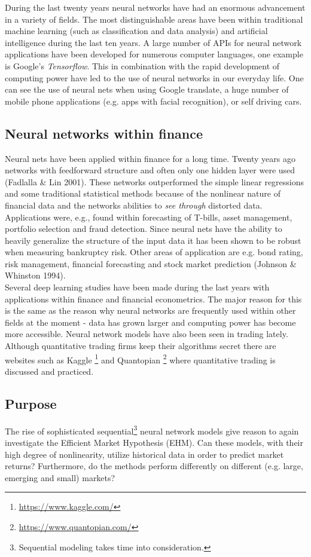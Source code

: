 \documentclass[12pt, letterpaper]{amsart}%
\begin{document}
During the last twenty years neural networks have had an enormous advancement in a variety of fields. The most distinguishable areas have been within traditional machine learning (such as classification and data analysis) and artificial intelligence during the last ten years. A large number of APIs for neural network applications have been developed for numerous computer languages, one example is Google's \textit{Tensorflow}. This in combination with the rapid development of computing power have led to the use of neural networks in our everyday life. One can see the use of neural nets when using Google translate, a huge number of mobile phone applications (e.g. apps with facial recognition), or self driving cars.

\subsection{Neural networks within finance}
Neural nets have been applied within finance for a long time. Twenty years ago networks with feedforward structure and often only one hidden layer were used (Fadlalla \& Lin 2001). These networks outperformed the simple linear regressions and some traditional statistical methods because of the nonlinear nature of financial data and the networks abilities to \textit{see through} distorted data. Applications were, e.g., found within forecasting of T-bills, asset management, portfolio selection and fraud detection. Since neural nets have the ability to heavily generalize the structure of the input data it has been shown to be robust when measuring bankruptcy risk. Other areas of application are e.g. bond rating, risk management, financial forecasting and stock market prediction (Johnson \& Whinston 1994).
\\

Several deep learning studies have been made during the last years with applications within finance and financial econometrics. The major reason for this is the same as the reason why neural networks are frequently used within other fields at the moment - data has grown larger and computing power has become more accessible. Neural network models have also been seen in trading lately. Although quantitative trading firms keep their algorithms secret there are websites such as Kaggle \footnote{\url{https://www.kaggle.com/}} and Quantopian \footnote{\url{https://www.quantopian.com/}} where quantitative trading is discussed and practiced.

\subsection{Purpose}
The rise of sophisticated sequential\footnote{Sequential modeling takes time into consideration.} neural network models give reason to again investigate the Efficient Market Hypothesis (EHM). Can these models, with their high degree of nonlinearity, utilize historical data in order to predict market returns? Furthermore, do the methods perform differently on different (e.g. large, emerging and small) markets?
\\
\end{document}
